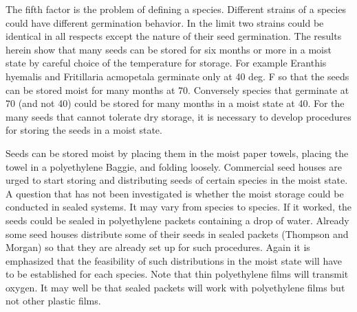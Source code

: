 The fifth factor is the problem of defining a species. Different strains of a
species could have different germination behavior. In the limit two strains could be
identical in all respects except the nature of their seed germination.
The results herein show that many seeds can be stored for six months or more
in a moist state by careful choice of the temperature for storage. For example Eranthis
hyemalis and Fritillaria acmopetala germinate only at 40 deg. F so that the seeds can
be stored moist for many months at 70. Conversely species that germinate at 70 (and
not 40) could be stored for many months in a moist state at 40. For the many seeds
that cannot tolerate dry storage, it is necessary to develop procedures for storing the
seeds in a moist state.

Seeds can be stored moist by placing them in the moist paper towels, placing
the towel in a polyethylene Baggie, and folding loosely. Commercial seed houses are
urged to start storing and distributing seeds of certain species in the moist state.
A question that has not been investigated is whether the moist storage could be
conducted in sealed systems. It may vary from species to species. If it worked, the
seeds could be sealed in polyethylene packets containing a drop of water. Already
some seed houses distribute some of their seeds in sealed packets (Thompson and
Morgan) so that they are already set up for such procedures. Again it is emphasized
that the feasibility of such distributions in the moist state will have to be established for
each species. Note that thin polyethylene films will transmit oxygen. It may well be
that sealed packets will work with polyethylene films but not other plastic films.

